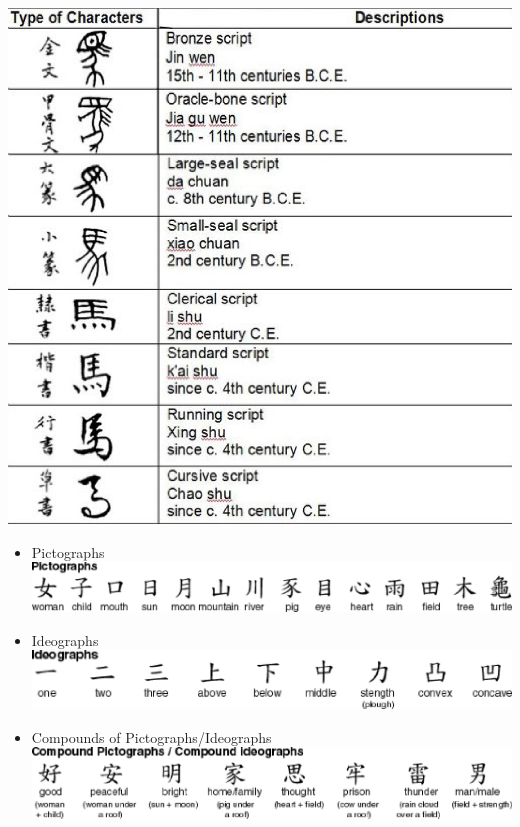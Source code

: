 \documentclass[a4paper,landscape,headrule,footrule,xetex]{foils}
\begin{document}

\includegraphics[height=\textheight]{../pics/horse-hanzi.eps}


\begin{itemize}
\item Pictographs\\
  \includegraphics{../pics/hanzi-1.eps}
\item Ideographs\\
  \includegraphics{../pics/hanzi-2.eps}
\item Compounds of Pictographs/Ideographs\\
  \includegraphics{../pics/hanzi-3.eps}
\end{itemize}
\end{document}
